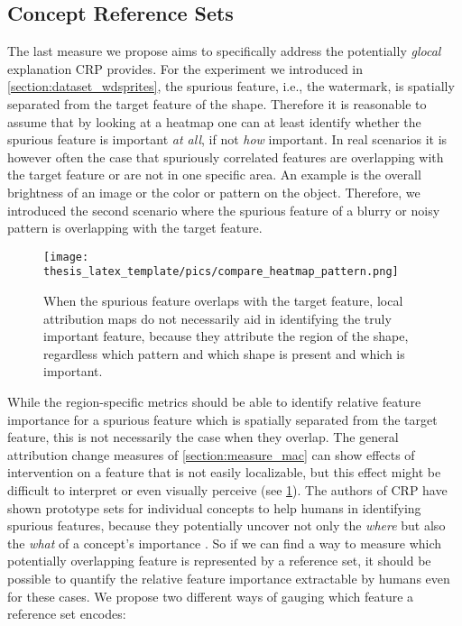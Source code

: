\subsection{Concept Reference Sets}\label{section:relmax_measure}
The last measure we propose aims to specifically address the potentially \textit{glocal} explanation CRP provides. For the experiment we introduced in \cref{section:dataset_wdsprites}, the spurious feature, i.e., the watermark, is spatially separated from the target feature of the shape. Therefore it is reasonable to assume that by looking at a heatmap one can at least identify whether the spurious feature is important \textit{at all}, if not \textit{how} important. 
In real scenarios it is however often the case that spuriously correlated features are overlapping with the target feature or are not in one specific area. An example is the overall brightness of an image or the color or pattern on the object. Therefore, we introduced the second scenario where the spurious feature of a blurry or noisy pattern is overlapping with the target feature.

\begin{figure}[t!]
    \centering
    \texttt{[image: thesis\_latex\_template/pics/compare\_heatmap\_pattern.png]}
    \caption[Heatmaps for Different Patterns]{When the spurious feature overlaps with the target feature, local attribution maps do not necessarily aid in identifying the truly important feature, because they attribute the region of the shape, regardless which pattern and which shape is present and which is important.}
    \label{fig:compare_heatmap_pattern}
\end{figure}

While the region-specific metrics should be able to identify relative feature importance for a spurious feature which is spatially separated from the target feature, this is not necessarily the case when they overlap. The general attribution change measures of \cref{section:measure_mac} can show effects of intervention on a feature that is not easily localizable, but this effect might be difficult to interpret or even visually perceive (see \cref{fig:compare_heatmap_pattern}). The authors of CRP have shown prototype sets for individual concepts to help humans in identifying spurious features, because they potentially uncover not only the \textit{where} but also the \textit{what} of a concept's importance \citep{Achtibat2023}. So if we can find a way to measure which potentially overlapping feature is represented by a reference set, it should be possible to quantify the relative feature importance extractable by humans even for these cases. 
We propose two different ways of gauging which feature a reference set encodes:

